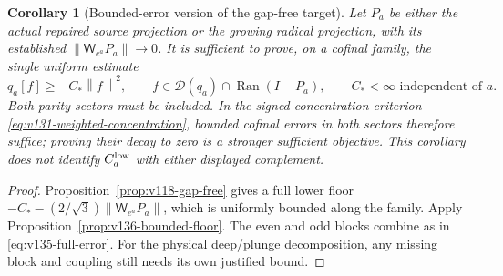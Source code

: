\documentclass[11pt]{article}
\newtheorem{corollary}[theorem]{Corollary}
\theoremstyle{remark}
\newcommand{\norm}[1]{\left\lVert #1\right\rVert}
\begin{document}
\begin{corollary}[Bounded-error version of the gap-free target]
\label{cor:v136-complement-floor}
Let $P_a$ be either the actual repaired source projection or the
growing radical projection, with its established
$\norm{\mathsf W_{e^a}P_a}\to0$. It is sufficient to prove, on a
cofinal family, the single uniform estimate
\begin{equation}\label{eq:v136-complement-target}
 q_a[f]\ge-C_*\norm f^2,
 \qquad f\in\mathcal D(q_a)\cap\operatorname{Ran}(I-P_a),
 \qquad C_*<\infty\text{ independent of }a.
\end{equation}
Both parity sectors must be included. In the signed concentration
criterion \eqref{eq:v131-weighted-concentration}, bounded cofinal
errors in both sectors therefore suffice; proving their decay to zero
is a stronger sufficient objective. This corollary does not identify
$C_a^{\rm low}$ with either displayed complement.
\end{corollary}
\begin{proof}
Proposition~\ref{prop:v118-gap-free} gives a full lower floor
$-C_*-(2/\sqrt3)\norm{\mathsf W_{e^a}P_a}$, which is uniformly
bounded along the family. Apply Proposition~\ref{prop:v136-bounded-floor}.
The even and odd blocks combine as in \eqref{eq:v135-full-error}.
For the physical deep/plunge decomposition, any missing block and
coupling still needs its own justified bound.
\end{proof}
\end{document}
